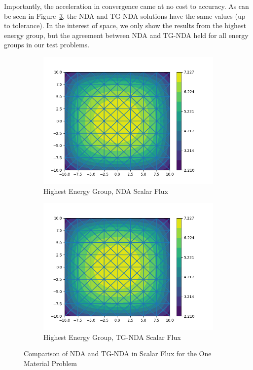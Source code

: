 Importantly, the acceleration in convergence came at no cost to accuracy. As can be seen in Figure~\ref{fig:Moderator}, the NDA and TG-NDA solutions have the same values (up to tolerance). In the interest of space, we only show the results from the highest energy group, but the agreement between NDA and TG-NDA held for all energy groups in our test problems. 
\begin{figure}[H]
\centering
\begin{subfigure}{.5\textwidth}
  \centering
  \includegraphics[width=\linewidth]{fig/nda_c5g7mod_scalar_flux_group0.png}
  \caption{Highest Energy Group, NDA Scalar Flux}
  \label{fig:NDA-Mod}
\end{subfigure}%
\begin{subfigure}{.5\textwidth}
  \centering
  \includegraphics[width=\linewidth]{fig/tgnda_c5g7mod_scalar_flux_group0.png}
  \caption{Highest Energy Group, TG-NDA Scalar Flux}
  \label{fig:TG-NDA-Mod}
\end{subfigure}
\caption{Comparison of NDA and TG-NDA in Scalar Flux for the One Material Problem}
\label{fig:Moderator}
\end{figure}

